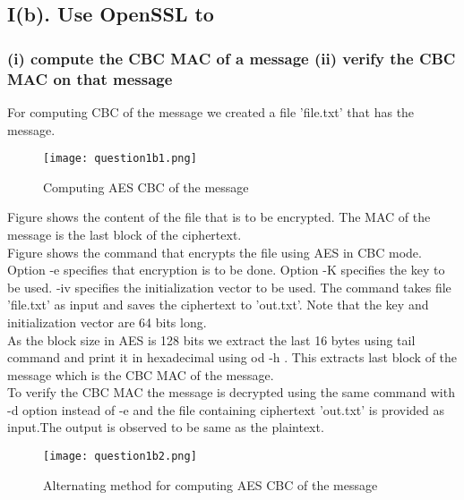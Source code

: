 \documentclass{article}
\begin{document}
\subsection*{I(b). Use OpenSSL to}
\subsubsection*{(i) compute the CBC MAC of a message (ii) verify the CBC MAC on that message} 

\noindent For computing CBC of the message we created a file 'file.txt' that has the message.

	\begin{figure}[htb]
	    \begin{center}
		\texttt{[image: question1b1.png]}
		\caption{Computing AES CBC of the message}
	     \end{center}
	\end{figure}

\noindent Figure shows the content of the file that is to be encrypted. The MAC of the message is the last block of the ciphertext.\\

\noindent Figure shows the command that encrypts the file using AES in CBC mode. Option -e specifies that encryption is to be done. Option -K specifies the key to be used. -iv specifies the initialization vector to be used. The command takes file 'file.txt' as input and saves the ciphertext to 'out.txt'. Note that the key and initialization vector are 64 bits long.\\

\noindent As the block size in AES is 128 bits we extract the last 16 bytes using tail command and print it in hexadecimal using od -h . This extracts last block of the message which is the CBC MAC of the message.\\

\noindent To verify the CBC MAC the message is decrypted using the same command with -d option instead of -e and the file containing ciphertext 'out.txt' is provided as input.The output is observed to be same as the plaintext.


	\begin{figure}[h]
	    \begin{center}
		\texttt{[image: question1b2.png]}
		\caption{Alternating method for computing AES CBC of the message}
	     \end{center}
	\end{figure}
\end{document}
